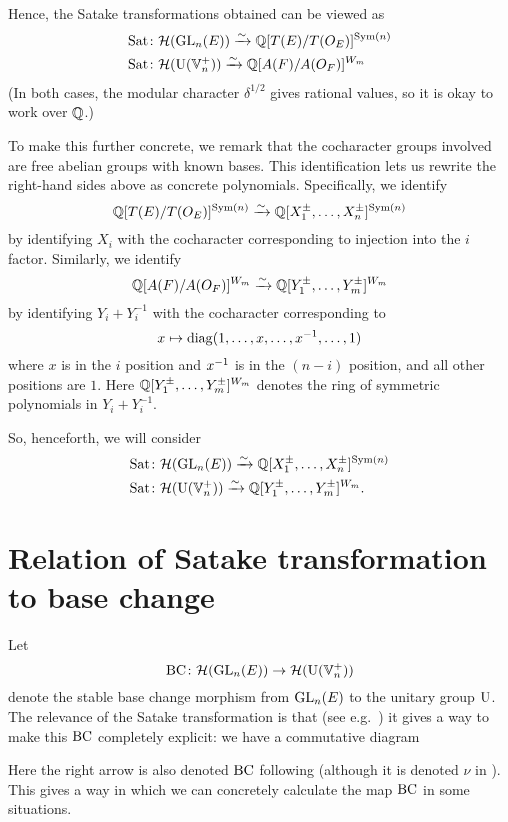 Hence, the Satake transformations obtained can be viewed as
\begin{align*}
  \operatorname{Sat} &\colon \mathcal H(\operatorname{GL}_n(E)) \xrightarrow{\sim} \mathbb Q[T(E) / T(O_E)]^{\operatorname{Sym}(n)} \\
  \operatorname{Sat} &\colon \mathcal H(\operatorname{U}(\mathbb V_n^+))\xrightarrow{\sim} \mathbb Q[A(F) / A(O_F)]^{W_m}
\end{align*}
(In both cases, the modular character $\delta^{1/2}$ gives rational values,
so it is okay to work over $\mathbb Q$.)

To make this further concrete, we remark that the cocharacter groups
involved are free abelian groups with known bases.
This identification lets us rewrite the right-hand sides above as concrete polynomials.
Specifically, we identify
\[ \mathbb Q[T(E) / T(O_E)]^{\operatorname{Sym}(n)}
  \xrightarrow{\sim} \mathbb Q[X_1^\pm, \dots, X_n^\pm]^{\operatorname{Sym}(n)} \]
by identifying $X_i$ with the
cocharacter corresponding to injection into the $i$ factor.
Similarly, we identify
\[ \mathbb Q[A(F) / A(O_F)]^{W_m}
  \xrightarrow{\sim} \mathbb Q[Y_1^{\pm}, \dots, Y_m^{\pm}]^{W_m} \]
by identifying $Y_i + Y_i^{-1}$
with the cocharacter corresponding to
\[ x \mapsto \operatorname{diag}(1, \dots, x, \dots, x^{-1}, \dots, 1) \]
where $x$ is in the $i$ position and $x^{-1}$ is in the $(n-i)$ position,
and all other positions are $1$.
Here $\mathbb Q[Y_1^{\pm}, \dots, Y_m^{\pm}]^{W_m}$
denotes the ring of symmetric polynomials in $Y_i + Y_i^{-1}$.

So, henceforth, we will consider
\begin{align*}
  \operatorname{Sat} &\colon \mathcal H(\operatorname{GL}_n(E)) \xrightarrow{\sim} \mathbb Q[X_1^\pm, \dots, X_n^\pm]^{\operatorname{Sym}(n)} \\
  \operatorname{Sat} &\colon \mathcal H(\operatorname{U}(\mathbb V_n^+)) \xrightarrow{\sim} \mathbb Q[Y_1^{\pm}, \dots, Y_m^{\pm}]^{W_m}.
\end{align*}

\section{Relation of Satake transformation to base change}
Let
\[ \operatorname{BC} \colon \mathcal H(\operatorname{GL}_n(E)) \to \mathcal H(\operatorname{U}(\mathbb V_n^+)) \]
denote the stable base change morphism from $\operatorname{GL}_n(E)$ to the unitary group $\operatorname{U}$.
The relevance of the Satake transformation is that
(see e.g.\ \cite[Proposition 3.4]{ref:leslie})
it gives a way to make this $\operatorname{BC}$ completely explicit:
we have a commutative diagram
\begin{center}
\end{center}
Here the right arrow is also denoted $\operatorname{BC}$ following \cite{ref:AFLspherical}
(although it is denoted $\nu$ in \cite{ref:leslie}).
This gives a way in which we can concretely calculate the map $\operatorname{BC}$
in some situations.

